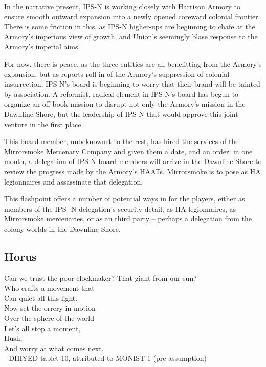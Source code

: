 In the narrative present, IPS-N is working closely with Harrison Armory to ensure smooth
outward expansion into a newly opened coreward colonial frontier. There is some friction in this,
as IPS-N higher-ups are beginning to chafe at the Armory’s imperious view of growth, and
Union’s seemingly blase response to the Armory’s imperial aims.

For now, there is peace, as the three entities are all benefitting from the Armory’s expansion, but
as reports roll in of the Armory’s suppression of colonial insurrection, IPS-N’s board is beginning
to worry that their brand will be tainted by association. A reformist, radical element in IPS-N’s
board has begun to organize an off-book mission to disrupt not only the Armory’s mission in the
Dawnline Shore, but the leadership of IPS-N that would approve this joint venture in the first
place.

This board member, unbeknownst to the rest, has hired the services of the Mirrorsmoke
Mercenary Company and given them a date, and an order: in one month, a delegation of IPS-N
board members will arrive in the Dawnline Shore to review the progress made by the Armory’s
HAATs. Mirrorsmoke is to pose as HA legionnaires and assassinate that delegation.

This flashpoint offers a number of potential ways in for the players, either as members of the IPS-
N delegation’s security detail, as HA legionnaires, as Mirrorsmoke mercenaries, or as an third
party -- perhaps a delegation from the colony worlds in the Dawnline Shore.

\subsection{Horus}
\begin{loreQuote}
                                    Can we trust the poor clockmaker? That giant from our
                                    sun?\\

                                     Who crafts a movement that\\

                                     Can quiet all this light.\\

                                    Now set the orrery in motion\\

                                     Over the sphere of the world\\

                                    Let’s all stop a moment,\\

                                    Hush,\\

                                    And worry at what comes next.\\

                                    \quad - \textnormal{DHIYED tablet 10, attributed to MONIST-1 (pre-assumption)}
\end{loreQuote}

